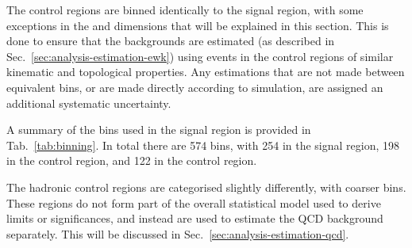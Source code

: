 The control regions are binned identically to the signal region, with some 
exceptions in the \mht and \nb dimensions that will be explained in this 
section. This is done to ensure that the backgrounds are 
estimated (as described in Sec.~\ref{sec:analysis-estimation-ewk}) using events 
in the control regions of similar kinematic and topological properties. Any 
estimations that are not made between equivalent bins, or are made directly 
according to simulation, are assigned an additional systematic uncertainty.

A summary of the bins used in the signal region is provided in 
Tab.~\ref{tab:binning}.
In total there are 574 bins, with 254 in the signal region, 198 in the \mj 
control region, and 122 in the \mmj control region.

The hadronic control regions are categorised slightly differently, with coarser 
bins. These regions do not form part of the overall statistical model used to 
derive limits or significances, and instead are used to estimate the QCD 
background separately. This will be discussed in 
Sec.~\ref{sec:analysis-estimation-qcd}.

